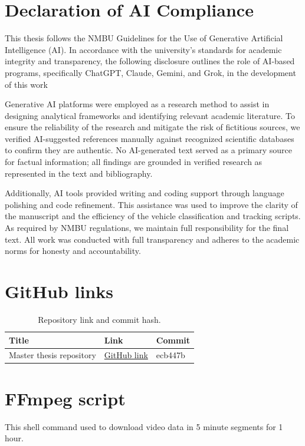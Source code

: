 
\chapter{Declaration of AI Compliance}
\label{app:AI_compliance}
This thesis follows the NMBU Guidelines for the Use of Generative Artificial Intelligence (AI). In accordance with the university’s standards for academic integrity and transparency, the following disclosure outlines the role of AI-based programs, specifically ChatGPT, Claude, Gemini, and Grok, in the development of this work

Generative AI platforms were employed as a research method to assist in designing analytical frameworks and identifying relevant academic literature. To ensure the reliability of the research and mitigate the risk of fictitious sources, we verified AI-suggested references manually against recognized scientific databases to confirm they are authentic. No AI-generated text served as a primary source for factual information; all findings are grounded in verified research as represented in the text and bibliography.  

Additionally, AI tools provided writing and coding support through language polishing and code refinement. This assistance was used to improve the clarity of the manuscript and the efficiency of the vehicle classification and tracking scripts. As required by NMBU regulations, we maintain full responsibility for the final text. All work was conducted with full transparency and adheres to the academic norms for honesty and accountability.

\chapter{GitHub links}
\label{app:github_links}
\begin{table}[H]
\centering
\caption{Repository link and commit hash.}
\label{tab:github_links}
\begin{tabular}{p{4.8cm} p{4.4cm} p{3.4cm}}
\toprule
\textbf{Title} & \textbf{Link} & \textbf{Commit} \\
\midrule
Master thesis repository & \href{https://github.com/sondreehaugen/Master_thesis}{GitHub link} & ecb447b \\
\bottomrule
\end{tabular}
\end{table}

\chapter{FFmpeg script}
\label{app:ffmpeg}
This shell command used to download video data in 5 minute segments for 1 hour.

